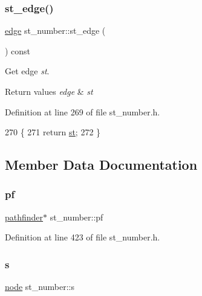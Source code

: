 \subsubsection{\texorpdfstring{st\+\_\+edge()}{st\_edge()}\hspace{0.1cm}{\footnotesize\ttfamily [2/2]}}
{\footnotesize\ttfamily \mbox{\hyperlink{classedge}{edge}} st\+\_\+number\+::st\+\_\+edge (\begin{DoxyParamCaption}{ }\end{DoxyParamCaption}) const\hspace{0.3cm}{\ttfamily [inline]}}



Get edge {\itshape st}. 


\begin{DoxyRetVals}{Return values}
{\em edge} & {\itshape st} \\
\hline
\end{DoxyRetVals}


Definition at line 269 of file st\+\_\+number.\+h.


\begin{DoxyCode}
270     \{
271     \textcolor{keywordflow}{return} \mbox{\hyperlink{classst__number_a58fe3a128f0d06ce17742b62d8eff1a8}{st}};
272     \}
\end{DoxyCode}


\subsection{Member Data Documentation}
\mbox{\label{classst__number_a2aa9c83b684379d86c4e620f0a3e5703}} 
\subsubsection{\texorpdfstring{pf}{pf}}
{\footnotesize\ttfamily \mbox{\hyperlink{classpathfinder}{pathfinder}}$\ast$ st\+\_\+number\+::pf\hspace{0.3cm}{\ttfamily [protected]}}



Definition at line 423 of file st\+\_\+number.\+h.

\mbox{\label{classst__number_a1ada73c04f88b70b2392aa9ab0d1a6b0}} 
\subsubsection{\texorpdfstring{s}{s}}
{\footnotesize\ttfamily \mbox{\hyperlink{classnode}{node}} st\+\_\+number\+::s\hspace{0.3cm}{\ttfamily [protected]}}




